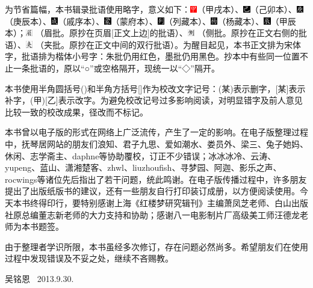 为节省篇幅，本书辑录批语使用略字，意义如下：\includegraphics[width=3mm]{../Images/00002}（甲戌本）、\includegraphics[width=3mm]{../Images/00003}（己卯本）、\includegraphics[width=3mm]{../Images/00004}（庚辰本）、\includegraphics[width=3mm]{../Images/00005}（戚序本）、\includegraphics[width=3mm]{../Images/00006}（蒙府本）、\includegraphics[width=3mm]{../Images/00007}（列藏本）、\includegraphics[width=3mm]{../Images/00008}（杨藏本）、\includegraphics[width=3mm]{../Images/00009}（甲辰本）；\includegraphics[width=3mm]{../Images/00010} （眉批。原抄在页眉{[}正文上边{]}的批语）、\includegraphics[width=3mm]{../Images/00011} （侧批。原抄在正文右侧的批语）、\includegraphics[width=3mm]{../Images/00012}  （夹批。原抄在正文中间的双行批语）。为醒目起见，本书正文排为宋体字，批语排为楷体小号字：朱批仍用红色，墨批仍用黑色。抄本中有些同一位置不止一条批语的，原以``○''或空格隔开，现统一以``◇''隔开。

本书使用半角圆括号()和半角方括号{[}{]}作为校改文字记号：(某)表示删字，{[}某{]}表示补字，(甲){[}乙{]}表示改字。为避免校改记号过多影响阅读，对明显错字及前人意见比较一致的校改成果，径改而不标记。

本书曾以电子版的形式在网络上广泛流传，产生了一定的影响。在电子版整理过程中，抚琴居网站的朋友们浪知、君子九思、爱如潮水、娄员外、梁三、兔子她妈、休闲、志学斋主、daphne等协助覆校，订正不少错误；冰冰冰冷、云涛、yupeng、蓝山、潇湘楚客、zhwl、liuzhoufish、寻梦园、阿迦、影乐之声、rocwings等诸位先后指出了若干问题，统此鸣谢。在电子版传播过程中，许多朋友提出了出版纸版书的建议，还有一些朋友自行打印装订成册，以方便阅读使用。今天本书终得印行，要特别感谢上海《红楼梦研究辑刊》主编萧凤芝老师、白山出版社原总编董志新老师的大力支持和协助；感谢八一电影制片厂高级美工师汪德龙老师为本书题签。

由于整理者学识所限，本书虽经多次修订，存在问题必然尚多。希望朋友们在使用过程中发现错误及不妥之处，继续不吝赐教。

\begin{flushright}
	吴铭恩 ~2013.9.30.
\end{flushright}~~~~
